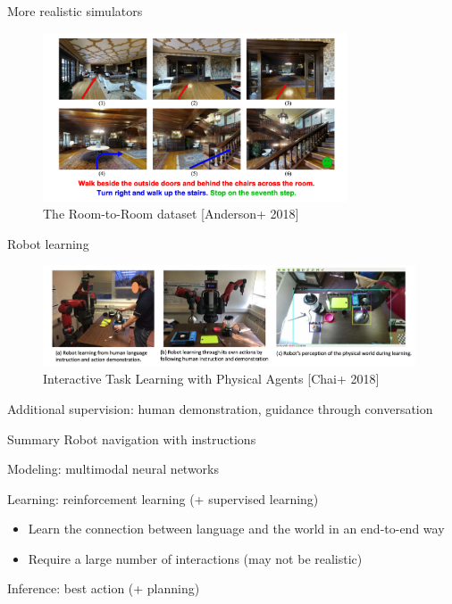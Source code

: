 \documentclass[usenames,dvipsnames,11pt,aspectratio=169]{beamer}
\begin{document}
\begin{frame}
    {More realistic simulators}
    \begin{figure}
        \includegraphics[height=5cm]{figures/r2r}
        \caption{The Room-to-Room dataset [Anderson+ 2018]}
    \end{figure}
\end{frame}

\begin{frame}
    {Robot learning}
    \begin{figure}
        \includegraphics[height=3cm]{figures/robot-rl}
        \caption{ Interactive Task Learning with Physical Agents [Chai+ 2018]}
    \end{figure}

    Additional supervision: human demonstration, guidance through conversation
\end{frame}

\begin{frame}
    {Summary}
    Robot navigation with instructions

    Modeling: multimodal neural networks

    Learning: reinforcement learning (+ supervised learning)\\
    \begin{itemize}
        \item Learn the connection between language and the world in an end-to-end way
        \item Require a large number of interactions (may not be realistic)
    \end{itemize}

    Inference: best action (+ planning)
\end{frame}
\end{document}
